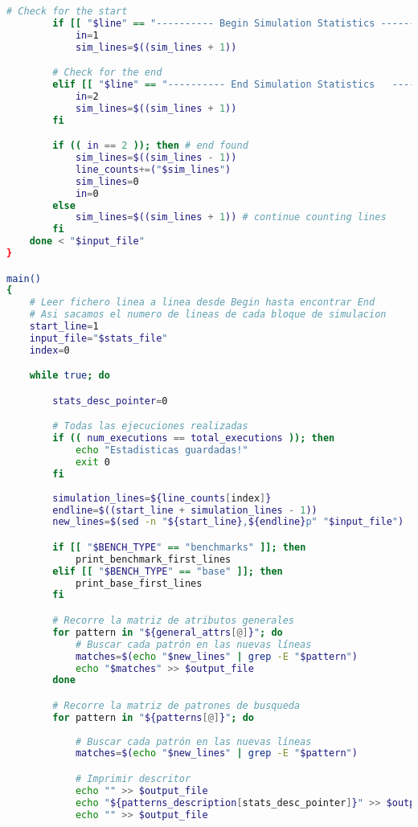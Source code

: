 \begin{lstlisting}[language=bash,caption={Programa de filtrado de estadísticas de Gem5},label=lst:getStats, showstringspaces=false,frame=single]
        # Check for the start
        if [[ "$line" == "---------- Begin Simulation Statistics ----------" ]]; then
            in=1
            sim_lines=$((sim_lines + 1))

        # Check for the end
        elif [[ "$line" == "---------- End Simulation Statistics   ----------" ]]; then
            in=2
            sim_lines=$((sim_lines + 1))
        fi

        if (( in == 2 )); then # end found
            sim_lines=$((sim_lines - 1))
            line_counts+=("$sim_lines")
            sim_lines=0
            in=0
        else
            sim_lines=$((sim_lines + 1)) # continue counting lines
        fi
    done < "$input_file"
}

main()
{
    # Leer fichero linea a linea desde Begin hasta encontrar End
    # Asi sacamos el numero de lineas de cada bloque de simulacion
    start_line=1
    input_file="$stats_file"
    index=0

    while true; do

        stats_desc_pointer=0

        # Todas las ejecuciones realizadas
        if (( num_executions == total_executions )); then
            echo "Estadisticas guardadas!"
            exit 0
        fi
        
        simulation_lines=${line_counts[index]}
        endline=$((start_line + simulation_lines - 1))
        new_lines=$(sed -n "${start_line},${endline}p" "$input_file")

        if [[ "$BENCH_TYPE" == "benchmarks" ]]; then
            print_benchmark_first_lines
        elif [[ "$BENCH_TYPE" == "base" ]]; then
            print_base_first_lines     
        fi

        # Recorre la matriz de atributos generales
        for pattern in "${general_attrs[@]}"; do
            # Buscar cada patrón en las nuevas líneas
            matches=$(echo "$new_lines" | grep -E "$pattern")
            echo "$matches" >> $output_file
        done

        # Recorre la matriz de patrones de busqueda
        for pattern in "${patterns[@]}"; do
            
            # Buscar cada patrón en las nuevas líneas
            matches=$(echo "$new_lines" | grep -E "$pattern")

            # Imprimir descritor
            echo "" >> $output_file
            echo "${patterns_description[stats_desc_pointer]}" >> $output_file
            echo "" >> $output_file


\end{lstlisting}

